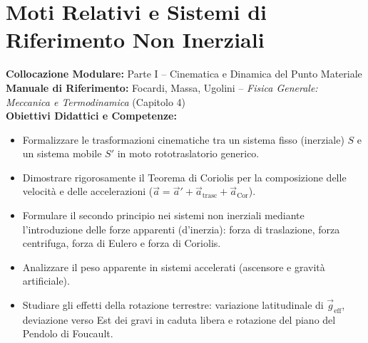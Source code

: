 \chapter{Moti Relativi e Sistemi di Riferimento Non Inerziali}
\label{chap:sistemi_non_inerziali}

\begin{tcolorbox}[enhanced, breakable, colback=navyblue!4!white, colframe=navyblue!80!black,
    coltitle=white, fonttitle=\bfseries\sffamily, title={Quadro Sinottico del Capitolo 04},
    sharp corners, rounded corners=south, boxrule=1pt]
\textbf{Collocazione Modulare:} Parte I -- Cinematica e Dinamica del Punto Materiale\\
\textbf{Manuale di Riferimento:} Focardi, Massa, Ugolini -- \emph{Fisica Generale: Meccanica e Termodinamica} (Capitolo 4)\\
\textbf{Obiettivi Didattici e Competenze:}\par
\begin{itemize}
    \item Formalizzare le trasformazioni cinematiche tra un sistema fisso (inerziale) $S$ e un sistema mobile $S'$ in moto rototraslatorio generico.
    \item Dimostrare rigorosamente il Teorema di Coriolis per la composizione delle velocità e delle accelerazioni ($\vec{a} = \vec{a}' + \vec{a}_{\text{trasc}} + \vec{a}_{\text{Cor}}$).
    \item Formulare il secondo principio nei sistemi non inerziali mediante l'introduzione delle forze apparenti (d'inerzia): forza di traslazione, forza centrifuga, forza di Eulero e forza di Coriolis.
    \item Analizzare il peso apparente in sistemi accelerati (ascensore e gravità artificiale).
    \item Studiare gli effetti della rotazione terrestre: variazione latitudinale di $\vec{g}_{\text{eff}}$, deviazione verso Est dei gravi in caduta libera e rotazione del piano del Pendolo di Foucault.
\end{itemize}
\end{tcolorbox}

\vspace{0.5em}

